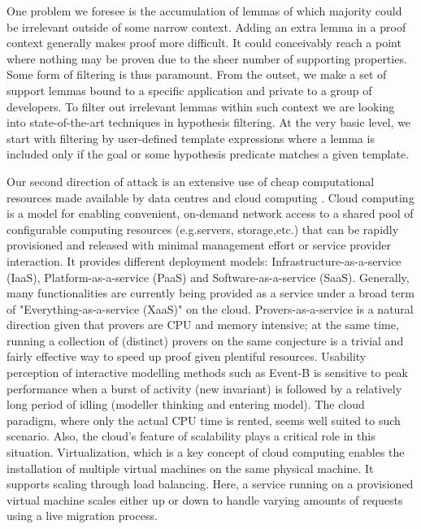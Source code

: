 \documentclass[twocolumn,a4paper,10pt]{article}
\begin{document}
One problem we foresee is the accumulation of lemmas of which majority could be irrelevant outside of some narrow context. Adding an extra lemma in a proof context generally makes proof more difficult. It could conceivably reach a point where nothing may be proven due to the sheer number of supporting properties. Some form of filtering is thus paramount. From the outset, we make a set of support lemmas bound to a specific application and private to a group of developers. To filter out irrelevant lemmas within such context we are looking into state-of-the-art techniques in hypothesis filtering. At the very basic level, we start with filtering by user-defined template expressions where a lemma is included only if the goal or some hypothesis predicate matches a given template. 

Our second direction of attack is an extensive use of cheap computational resources made available by data centres and cloud computing \cite{cloud}. Cloud computing is a model for enabling convenient, on-demand network access to a shared pool of configurable computing resources (e.g.servers, storage,etc.) that can be rapidly provisioned and released with minimal management effort or service provider interaction. It provides different deployment models: Infrastructure-as-a-service (IaaS), Platform-as-a-service (PaaS) and Software-as-a-service (SaaS). Generally, many functionalities are currently being provided as a service under a broad term of "Everything-as-a-service (XaaS)" on the cloud. Provers-as-a-service is a natural direction given that provers are CPU and memory intensive; at the same time, running a collection of (distinct) provers on the same conjecture is a trivial and fairly effective way to speed up proof given plentiful resources. Usability perception of interactive modelling methods such as Event-B is sensitive to peak performance when a burst of activity (new invariant) is followed by a relatively long period of idling (modeller thinking and entering model). The cloud paradigm, where only the actual CPU time is rented, seems well suited to such scenario. Also, the cloud's feature of scalability plays a critical role in this situation. Virtualization, which is a key concept of cloud computing enables the installation of multiple virtual machines on the same physical machine. It supports scaling through load balancing. Here, a service running on a provisioned virtual machine scales either up or down to handle varying amounts of requests using a live migration process.
\end{document}
